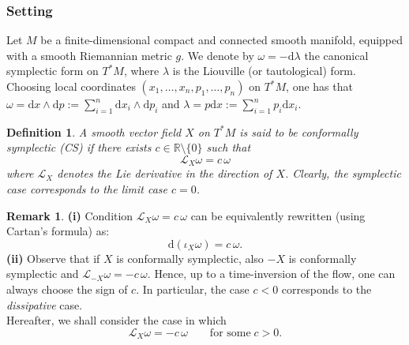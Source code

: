\documentclass[11pt]{article}
\newtheorem{definition}[lemma]{Definition}
\theoremstyle{definition}
\newtheorem{remark}[lemma]{Remark}
\def\d{\mathrm{d}}
\begin{document}
\subsubsection{Setting}
Let $M$ be a finite-dimensional compact and connected smooth manifold, equipped with a smooth Riemannian metric $g$.
We denote by $\omega=-\d\lambda$ the canonical symplectic form on $T^*M$, where $\lambda$ is the Liouville (or tautological) form. Choosing local coordinates $(x_1,\ldots, x_n, p_1,\ldots , p_n)$ on $T^*M$, one has that $\omega= \d x\wedge \d p := \sum_{i=1}^n \d x_i\wedge \d p_i$ and $\lambda=p\d x := \sum_{i=1}^n p_i\d x_i$.\\

\begin{definition}
A smooth vector field $X$ on $T^*M$ is said to be {\it conformally symplectic} (CS) if there exists $c \in {\mathbb R}\setminus\{0\}$ such that $${\mathcal L}_X \omega = c \,\omega$$ where ${\mathcal L}_X$ denotes the Lie derivative in the direction of $X$. Clearly, the symplectic case corresponds to the limit case $c =0$. \\
\end{definition}

\begin{remark}
{\bf (i)} Condition ${\mathcal L}_X \omega = c \,\omega$ can be equivalently rewritten (using Cartan's formula) as:
$$
\d (\iota_X \omega) = c \,\omega.
$$
{\bf (ii)} Observe that if $X$ is conformally symplectic, also $-X$ is conformally symplectic and ${\mathcal L}_{-X} \omega = -c \,\omega$.
Hence, up to a time-inversion of the flow, one can always choose the sign of $c$. In particular, the case $c<0$ corresponds to the {\it dissipative} case.\\
Hereafter, we shall consider the case in which
\begin{equation}\label{hypconfsymp}
{\mathcal L}_{X} \omega = -c \,\omega \qquad \mbox{for some}\; c>0.
\end{equation}
\end{remark}

\medskip
\end{document}
